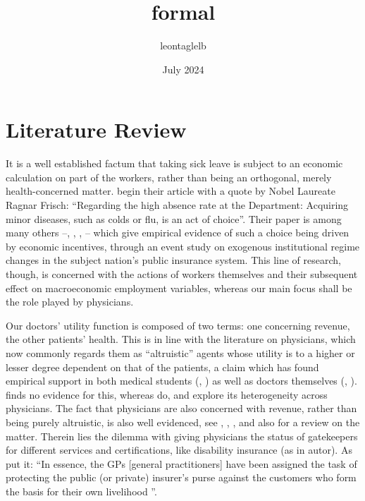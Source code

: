 \documentclass{article}
\title{formal}
\author{leontaglelb }
\date{July 2024}
\begin{document}
\maketitle

\section{Literature Review}


It is a well established factum that taking sick leave is subject to an economic calculation on part of the workers, rather than being an orthogonal, merely health-concerned matter. \cite{JohanssonPalme} begin their article with a quote by Nobel Laureate Ragnar Frisch: ``Regarding the high absence rate at the Department: Acquiring minor diseases, such as colds or flu, is an act of choice''. Their paper is among many others --\cite{italian-jobs}, \cite{norway-jobs}, \cite{us-jobs}, \cite{sweden-jobs}-- which give empirical evidence of such a choice being driven by economic incentives, through an event study on exogenous institutional regime changes in the subject nation's public insurance system. This line of research, though, is concerned with the actions of workers themselves and their subsequent effect on macroeconomic employment variables, whereas our main focus shall be the role played by physicians.

Our doctors' utility function is composed of two terms: one concerning revenue, the other patients' health. This is in line with the literature on physicians, which now commonly regards them as ``altruistic'' agents whose utility is to a higher or lesser degree dependent on that of the patients, a claim which has found empirical support in both medical students (\cite{avengers}, \cite{hs-wiesen}) as well as doctors themselves (\cite{hippocrates}, \cite{brosigkoch}). \cite{crea2019physician} finds no evidence for this, whereas \cite{godager2013profit} do, and explore its heterogeneity across physicians. The fact that physicians are also concerned with revenue, rather than being purely altruistic, is also well evidenced, see \cite{clemensgottlieb}, \cite{HSW}, \cite{autor}, and also \cite{rrk2012} for a review on the matter. Therein lies the dilemma with giving physicians the status of gatekeepers for different services and certifications, like disability insurance (as in autor). As \citet[p.~1]{markussen-roed} put it: ``In essence, the GPs [general practitioners] have been assigned the task of protecting the public (or private) insurer's purse against the customers who form the basis for their own livelihood ''.




\newpage
	 

\end{document}
